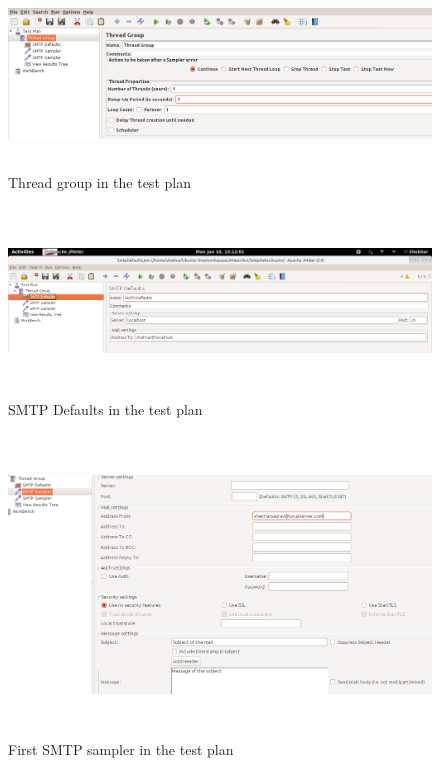 \documentclass[12pt]{book}
\begin{document}
    
  \begin{figure}[H]
   \centering
   \includegraphics[width=15cm, height=5cm]{images/smtpdefaults_81}
   \caption{Thread group in the test plan\label{fig:fig28_JMeter}}
  \end{figure} 
  
  \begin{figure}[H]
   \centering
   \includegraphics[width=15cm, height=5cm]{images/smtpdefaults_82}
   \caption{SMTP Defaults in the test plan\label{fig:fig29_JMeter}}
  \end{figure}   
  
  \begin{figure}[H]
   \centering
   \includegraphics[width=15cm, height=8cm]{images/smtpdefaults_83}
   \caption{First SMTP sampler in the test plan\label{fig:fig30_JMeter}}
  \end{figure} 
  
\end{document}
